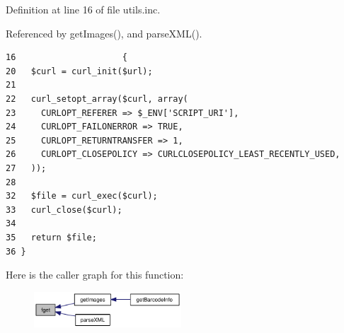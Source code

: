 Definition at line 16 of file utils.inc.

Referenced by getImages(), and parseXML().

\begin{Code}\begin{verbatim}16                     {
20   $curl = curl_init($url);
21 
22   curl_setopt_array($curl, array(
23     CURLOPT_REFERER => $_ENV['SCRIPT_URI'],
24     CURLOPT_FAILONERROR => TRUE,
25     CURLOPT_RETURNTRANSFER => 1,
26     CURLOPT_CLOSEPOLICY => CURLCLOSEPOLICY_LEAST_RECENTLY_USED,
27   ));
28 
32   $file = curl_exec($curl);
33   curl_close($curl);
34 
35   return $file;
36 }\end{verbatim}
\end{Code}




Here is the caller graph for this function:\nopagebreak
\begin{figure}[H]
\begin{center}
\leavevmode
\includegraphics[width=156pt]{utils_8inc_846199262ea0cd07e0531f38d26dd9b3_icgraph}
\end{center}
\end{figure}
